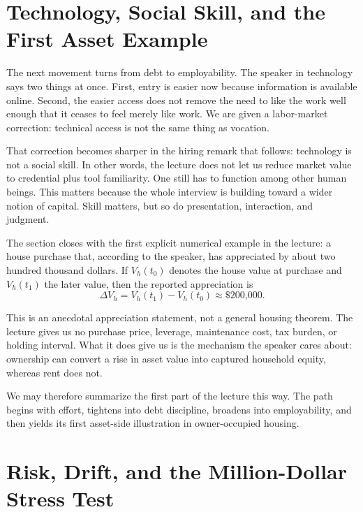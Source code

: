 \section{Technology, Social Skill, and the First Asset Example}

The next movement turns from debt to employability. The speaker in technology says two things at once. First, entry is easier now because information is available online. Second, the easier access does not remove the need to like the work well enough that it ceases to feel merely like work. We are given a labor-market correction: technical access is not the same thing as vocation.

That correction becomes sharper in the hiring remark that follows: technology is not a social skill. In other words, the lecture does not let us reduce market value to credential plus tool familiarity. One still has to function among other human beings. This matters because the whole interview is building toward a wider notion of capital. Skill matters, but so do presentation, interaction, and judgment.

The section closes with the first explicit numerical example in the lecture: a house purchase that, according to the speaker, has appreciated by about two hundred thousand dollars. If \(V_h(t_0)\) denotes the house value at purchase and \(V_h(t_1)\) the later value, then the reported appreciation is
\begin{equation}
\Delta V_h = V_h(t_1)-V_h(t_0) \approx \text{\$200{,}000}.
\end{equation}

\begin{remark}
This is an anecdotal appreciation statement, not a general housing theorem. The lecture gives us no purchase price, leverage, maintenance cost, tax burden, or holding interval. What it does give us is the mechanism the speaker cares about: ownership can convert a rise in asset value into captured household equity, whereas rent does not.
\end{remark}

We may therefore summarize the first part of the lecture this way. The path begins with effort, tightens into debt discipline, broadens into employability, and then yields its first asset-side illustration in owner-occupied housing.

\section{Risk, Drift, and the Million-Dollar Stress Test}

